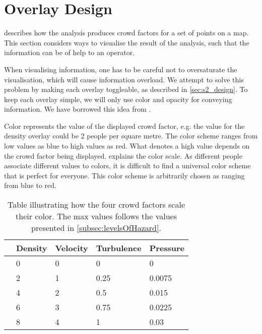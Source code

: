\section{Overlay Design} \label{sec:s4_overlay}

 describes how the analysis produces crowd factors for a set of points on a map. This section considers ways to visualise the result of the analysis, such that the information can be of help to an operator.

When visualising information, one has to be careful not to oversaturate the visualisation, which will cause information overload. We attempt to solve this problem by making each overlay toggleable, as described in \cref{sec:s2_design}. To keep each overlay simple, we will only use color and opacity for conveying information. We have borrowed this idea from \citet{wirz2012inferring}.

Color represents the value of the displayed crowd factor, e.g. the value for the density overlay could be 2 people per square metre. The color scheme ranges from low values as blue to high values as red. What denotes a high value depends on the crowd factor being displayed.  explains the color scale. As different people associate different values to colors, it is difficult to find a universal color scheme that is perfect for everyone. This color scheme is arbitrarily chosen as ranging from blue to red.

\begin{table}[htbp]
    \centering
    \begin{tabular}{l l l l l} \toprule
                        & Density & Velocity & Turbulence & Pressure \\ \midrule
    \cellcolor{low}     & 0       & 0        & 0          & 0         \\
    \cellcolor{medium}  & 2       & 1        & 0.25       & 0.0075         \\
    \cellcolor{high}    & 4       & 2        & 0.5        & 0.015         \\
    \cellcolor{higher}  & 6       & 3        & 0.75       & 0.0225         \\
    \cellcolor{highest} & 8       & 4        & 1          & 0.03         \\ \bottomrule
    \end{tabular}
    \caption{Table illustrating how the four crowd factors scale their color. The max values follows the values presented in \cref{subsec:levelsOfHazard}.}
    \label{tab:color_scale}
\end{table}

